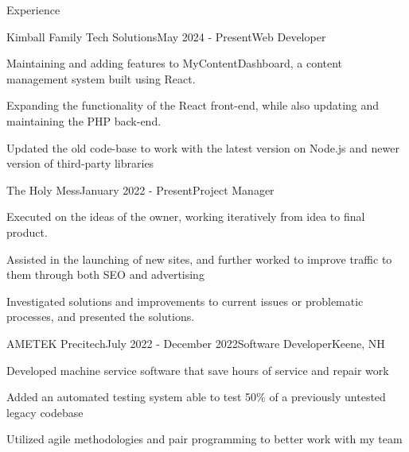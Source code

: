 \documentclass[
	11pt, %
]{resume} %
\begin{document}
\begin{rSection}{Experience}

	\begin{rSubsection}{Kimball Family Tech Solutions}{May 2024 - Present}{Web Developer}{}
        \item Maintaining and adding features to MyContentDashboard, a content management system built using React. 
        \item Expanding the functionality of the React front-end, while also updating and maintaining the PHP back-end.
        \item Updated the old code-base to work with the latest version on Node.js and newer version of third-party libraries
	\end{rSubsection}


	\begin{rSubsection}{The Holy Mess}{January 2022 - Present}{Project Manager}{}
		\item Executed on the ideas of the owner, working iteratively from idea to final product.
        \item Assisted in the launching of new sites, and further worked to improve traffic to them through both SEO and advertising
        \item Investigated solutions and improvements to current issues or problematic processes, and presented the solutions.
	\end{rSubsection}
 
	\begin{rSubsection}{AMETEK Precitech}{July 2022 - December 2022}{Software Developer}{Keene, NH}
        \item Developed machine service software that save hours of service and repair work
        \item Added an automated testing system able to test 50\% of a previously untested legacy codebase
        \item Utilized agile methodologies and pair programming to better work with my team
	\end{rSubsection}

\end{rSection}

\end{document}
